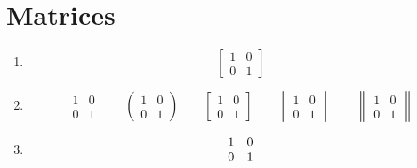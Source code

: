 \documentclass[fleqn]{article}
\begin{document}
	\section{Matrices}
	
	\begin{enumerate}
	
		\item 
		$$
		[
		\begin{matrix}
			1 & 0 \\
			0 & 1
		\end{matrix}
		]
		$$
		
		\item 
		$$
		\begin{matrix}
			1 & 0 \\
			0 & 1
		\end{matrix}
		\qquad
		\begin{pmatrix}
			1 & 0 \\
			0 & 1
		\end{pmatrix}
		\qquad
		\begin{bmatrix}
			1 & 0 \\
			0 & 1
		\end{bmatrix}
		\qquad	
		\begin{vmatrix}
			1 & 0 \\
			0 & 1
		\end{vmatrix}
		\qquad	
		\begin{Vmatrix}
			1 & 0 \\
			0 & 1
		\end{Vmatrix}
		$$
		
		\item 
		$$
		\begin{array}{c c}
			1 & 0 \\
			0 & 1	
		\end{array}
		$$
	
	\end{enumerate}
	
\end{document}
